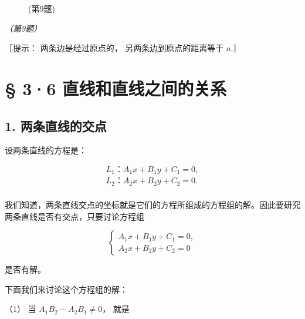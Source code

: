 \begin{figure}
\centering
{}
\caption{(第9题)}
\end{figure}

\emph{（第9题）}

［提示： 两条边是经过原点的， 另两条边到原点的距离等于 \(a\).］

\section{§ 3·6
直线和直线之间的关系}\label{ux76f4ux7ebfux548cux76f4ux7ebfux4e4bux95f4ux7684ux5173ux7cfb}

\subsection{1.
两条直线的交点}\label{ux4e24ux6761ux76f4ux7ebfux7684ux4ea4ux70b9}

设两条直线的方程是：

\[
\begin{array}{l} L_{1}\text{：} A_{1} x + B_{1} y + C_{1} = 0, \\ L_{2}\text{：} A_{2} x + B_{2} y + C_{2} = 0. \\ \end{array}
\]

我们知道，两条直线交点的坐标就是它们的方程所组成的方程组的解。因此要研究两条直线是否有交点，只要讨论方程组

\[
\left\{ \begin{array}{l} A_{1} x + B_{1} y + C_{1} = 0, \\ A_{2} x + B_{2} y + C_{2} = 0 \end{array} \right.
\]

是否有解。

下面我们来讨论这个方程组的解：

（1） 当 \(A_{1}B_{2} - A_{2}B_{1} \neq 0\)， 就是

